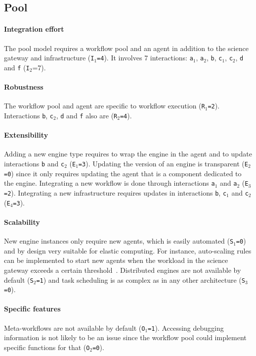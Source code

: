 \documentclass[preprint,3p,twocolumn]{elsarticle}
\begin{document}
\subsection{Pool}

\paragraph{Integration effort} The pool model requires a workflow pool and an
agent in addition to the science gateway and infrastructure
(\texttt{I$_1$=4}). It involves 7 interactions: \texttt{a$_1$},
\texttt{a$_2$}, \texttt{b}, \texttt{c$_1$}, \texttt{c$_2$}, \texttt{d}
and \texttt{f} (\texttt{I$_2$}=7).

\paragraph{Robustness} The workflow pool and agent are specific to
workflow execution (\texttt{R$_1$=2}). Interactions \texttt{b},
\texttt{c$_2$}, \texttt{d} and \texttt{f} also are (\texttt{R$_2$=4}).

\paragraph{Extensibility} Adding a new engine type requires to wrap
the engine in the agent and to update interactions \texttt{b} and
\texttt{c$_2$} (\texttt{E$_1$=3}). Updating the version of an engine
is transparent (\texttt{E$_2$=0}) since it only requires updating the
agent that is a component dedicated to the engine. Integrating a new workflow is
done through interactions \texttt{a$_1$} and \texttt{a$_2$}
(\texttt{E$_3$=2}). Integrating a new infrastructure requires updates
in interactions \texttt{b}, \texttt{c$_1$} and \texttt{c$_2$}
(\texttt{E$_4$=3}).

\paragraph{Scalability} New engine instances only require new agents,
which is easily automated (\texttt{S$_1$=0}) and by design very
suitable for elastic computing. For instance, auto-scaling rules can
be implemented to start new agents when the workload in the science
gateway exceeds a certain threshold~\cite{lorido2012auto}. Distributed
engines are not available by default (\texttt{S$_2$=1}) and task
scheduling is as complex as in any other architecture
(\texttt{S$_3$=0}).

\paragraph{Specific features} Meta-workflows are not available by default
(\texttt{O$_1$=1}).  Accessing debugging information is not likely to
be an issue since the workflow pool could implement specific functions
for that (\texttt{O$_2$=0}).
\end{document}
